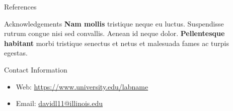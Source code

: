 \documentclass{beamer} %
\begin{document}
\begin{frame}[t]
\begin{columns}[t]
\begin{column}{0.465\textwidth}

\begin{block}{References}
	\nocite{*} %
	\small %
	\vspace{-1ex} %
\end{block}


\begin{block}{Acknowledgements}
	\textbf{Nam mollis} tristique neque eu luctus. Suspendisse rutrum congue nisi sed convallis. Aenean id neque dolor. \textbf{Pellentesque habitant} morbi tristique senectus et netus et malesuada fames ac turpis egestas.
\end{block}



\begin{block}{Contact Information}
	\begin{itemize}
		\item Web: \href{https://www.university.edu/labname}{https://www.university.edu/labname}
		\item Email: \href{mailto:davidl11@illinois.edu}{davidl11@illinois.edu}
	\end{itemize}
\end{block}


\end{column} %

\begin{column}{0.02\textwidth}\end{column} %

\end{columns} %

\end{frame} %

\end{document}
